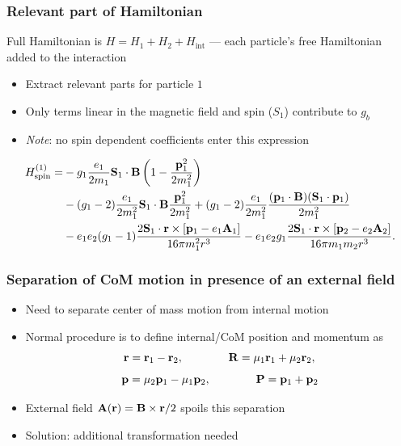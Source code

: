 \documentclass[11ppt]{beamer}
\newcommand{\beq}{\begin{equation*} }
\newcommand{\eeq}{\end{equation*} }
\begin{document}
\begin{frame}
\frametitle{Relevant part of Hamiltonian}
Full Hamiltonian is  $H = H_1 + H_2 + H_\text{int}$ --- each particle's free Hamiltonian added to the interaction 
\begin{itemize}
  \item Extract relevant parts for particle $1$
  \item Only terms linear in the magnetic field and spin ($S_1$) contribute to $g_b$
  \item \emph{Note}: no spin dependent coefficients enter this expression
\end{itemize}
  
\footnotesize
\beq
\begin{split}
	H^{(1)}_\text{spin} =&
		-g_1 \frac{e_1}{2m_1} \v{S}_1 \cdot \v{B} \left( 1 - \frac{ \v{p}_1^2 }{2m_1^2} \right )
		\\&-(g_1-2) \frac{e_1}{2m^2_1} \v{S}_1 \cdot \v{B} \frac{\v{p}_1^2 }{2m_1^2} 
		+ (g_1-2)  \frac{e_1}{2m^2_1} \frac{( \v{p}_1 \cdot \v{B})(\v{S}_1 \cdot \v{p}_1 )}{2m_1^2}
		\\& -e_1 e_2 (g_1 -1) \frac{ 2 \v{S}_1 \cdot \v{r} \times [\v{p}_1 -e_1\v{A}_1 ] }{16 \pi m_1^2 r^3}
		-e_1 e_2 g_1 \frac{ 2 \v{S}_1 \cdot \v{r} \times [\v{p}_2 -e_2\v{A}_2 ] }{16 \pi m_1 m_2 r^3}.
\end{split}
\eeq
\normalsize

\end{frame}



\begin{frame}
\frametitle{Separation of CoM motion in presence of an external field}
\begin{itemize}
  \item 	Need to separate center of mass motion from internal motion
  \item 	Normal procedure is to define internal/CoM position and momentum as
  	\beq
		\v{r} = \v{r}_1 - \v{r}_2 , \hspace{4em}   \v{R} = \mu_1 \v{r}_1 + \mu_2 \v{r}_2,
	\eeq
	\beq
		\v{p} = \mu_2 \v{p}_1 - \mu_1 \v{p}_2, \hspace{4em}   \v{P} = \v{p}_1 + \v{p}_2
	\eeq
  \item  	External field $\mathbf{A}(\mathbf{r}) = \mathbf{B} \times \mathbf{r} /2$ spoils this separation
  \item 	Solution: additional transformation needed 
\end{itemize}
\end{frame}
\end{document}
